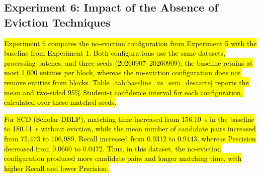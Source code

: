\documentclass{ieeeaccess}
\begin{document}
\begin{table}[h]
\centering
\caption{\hl{Mean $\pm$ 95\% confidence-interval margin over three runs for MusicBrainz with different offsets.}}
\label{tab:music-brainz-results-transposed}
%
\end{table}

\subsection{Experiment 6: Impact of the Absence of Eviction Techniques} \label{exp6}

\hl{Experiment 6 compares the no-eviction configuration from Experiment 5 with the baseline from Experiment 1. Both configurations use the same datasets, processing batches, and three seeds (20260907--20260909); the baseline retains at most 1,000 entities per block, whereas the no-eviction configuration does not remove entities from blocks. Table~\ref{tab:baseline_vs_sem_descarte} reports the mean and two-sided 95\% Student-$t$ confidence interval for each configuration, calculated over these matched seeds.}

\hl{For SCD (Scholar-DBLP), matching time increased from 156.10~s in the baseline to 180.11~s without eviction, while the mean number of candidate pairs increased from 75,473 to 106,989. Recall increased from 0.9312 to 0.9443, whereas Precision decreased from 0.0660 to 0.0472. Thus, in this dataset, the no-eviction configuration produced more candidate pairs and longer matching time, with higher Recall and lower Precision.}
\end{document}
